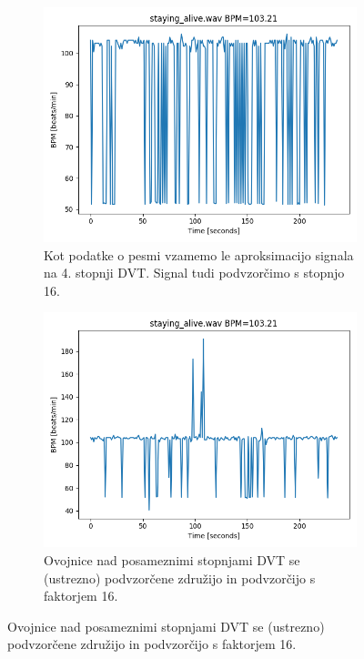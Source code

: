 \documentclass[a4paper,11pt]{article}
\begin{document}
\begin{figure}
\centering
\begin{subfigure}{0.48\textwidth}
\includegraphics[width=\linewidth]{images/sa_bpm_single.png}
\caption{Kot podatke o pesmi vzamemo le aproksimacijo signala na 4. stopnji DVT. Signal tudi podvzorčimo s stopnjo 16.} \label{sa_bpm:1a}
\end{subfigure}
\hspace*{\fill} %
\begin{subfigure}{0.48\textwidth}
\includegraphics[width=\linewidth]{images/sa_bpm_multiple_subs16.png}
\caption{Ovojnice nad posameznimi stopnjami DVT se (ustrezno) podvzorčene združijo in podvzorčijo s faktorjem 16.} \label{sa_bpm:1b}
\end{subfigure}


\end{figure}
\end{document}
